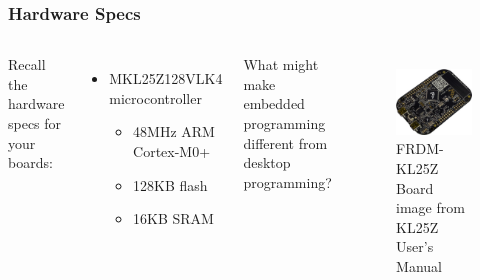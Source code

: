 \documentclass{beamer}
\begin{document}
\begin{frame}
\frametitle{Hardware Specs}
\begin{columns}[t]
Recall the hardware specs for your boards:
\vspace{10px}
\begin{itemize}
  \item MKL25Z128VLK4 microcontroller
  \begin{itemize}
    \item 48MHz ARM Cortex-M0+
    \item 128KB flash
    \item 16KB SRAM
  \end{itemize}
\end{itemize}
\vspace{10px}
What might make embedded programming different from desktop programming?

\begin{figure}
\centering
\includegraphics[width=1.0\columnwidth]{images-dis1/kl25z} \\
FRDM-KL25Z Board \\
{\tiny image from KL25Z User's Manual}
\end{figure}
\end{columns}
\end{frame}
\end{document}
